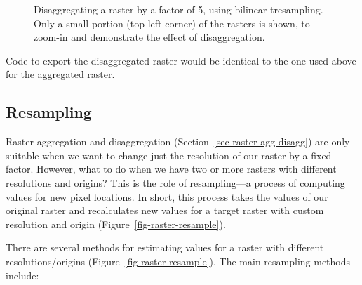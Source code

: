 \documentclass[
  letterpaper,
]{krantz}
\begin{document}
\begin{figure}

\begin{minipage}{0.50\linewidth}



\end{minipage}%
%
\begin{minipage}{0.50\linewidth}



\end{minipage}%

\caption{\label{fig-raster-disaggregate}Disaggregating a raster by a
factor of 5, using bilinear tresampling. Only a small portion (top-left
corner) of the rasters is shown, to zoom-in and demonstrate the effect
of disaggregation.}

\end{figure}%

Code to export the disaggregated raster would be identical to the one
used above for the aggregated raster.

\subsection{Resampling}\label{sec-raster-resampling}

Raster aggregation and disaggregation
(Section~\ref{sec-raster-agg-disagg}) are only suitable when we want to
change just the resolution of our raster by a fixed factor. However,
what to do when we have two or more rasters with different resolutions
and origins? This is the role of resampling---a process of computing
values for new pixel locations. In short, this process takes the values
of our original raster and recalculates new values for a target raster
with custom resolution and origin (Figure~\ref{fig-raster-resample}).

There are several methods for estimating values for a raster with
different resolutions/origins (Figure~\ref{fig-raster-resample}). The
main resampling methods include:
\end{document}
